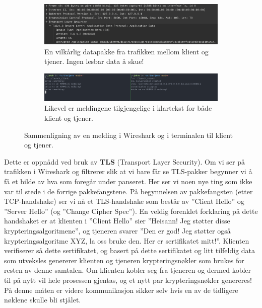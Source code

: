 \documentclass{article}
\begin{document}
\begin{figure}[ht]
    \centering
    \begin{subfigure}{\linewidth}
        \includegraphics[width=\linewidth]{illustrasjoner/P4-TLS-header.png}
        \caption{En vilkårlig datapakke fra trafikken mellom klient og tjener. Ingen lesbar data å skue!}
    \end{subfigure}

    \begin{subfigure}{\linewidth}
        \includegraphics[width=\linewidth]{illustrasjoner/P4-TLS-terminal.png}
        \caption{Likevel er meldingene tilgjengelige i klartekst for både klient og tjener.}
    \end{subfigure}
    \caption{Sammenligning av en melding i Wireshark og i terminalen til klient og tjener.}
\end{figure}

Dette er oppnådd ved bruk av \textbf{TLS} (Transport Layer Security). Om vi ser på trafikken i Wireshark og filtrerer slik at vi bare får se TLS-pakker begynner vi å få et bilde av hva som foregår under panseret. Her ser vi noen nye ting som ikke var til stede i de forrige pakkefangstene. På begynnelsen av pakkefangsten (etter TCP-handshake) ser vi nå et TLS-handshake som består av ''Client Hello'' og ''Server Hello'' (og ''Change Cipher Spec''). En veldig forenklet forklaring på dette handshaket er at klienten i ''Client Hello'' sier ''Heisann! Jeg støtter disse krypteringsalgoritmene'', og tjeneren svarer ''Den er god! Jeg støtter også krypteringsalgoritme XYZ, la oss bruke den. Her er sertifikatet mitt!''. Klienten verifiserer så dette sertifikatet, og basert på dette sertifikatet og litt tilfeldig data som utveksles genererer klienten og tjeneren krypteringsnøkler som brukes for resten av denne samtalen. Om klienten kobler seg fra tjeneren og dermed kobler til på nytt vil hele prosessen gjentas, og et nytt par krypteringsnøkler genereres! På denne måten er videre kommunikasjon sikker selv hvis en av de tidligere nøklene skulle bli stjålet.
\end{document}

